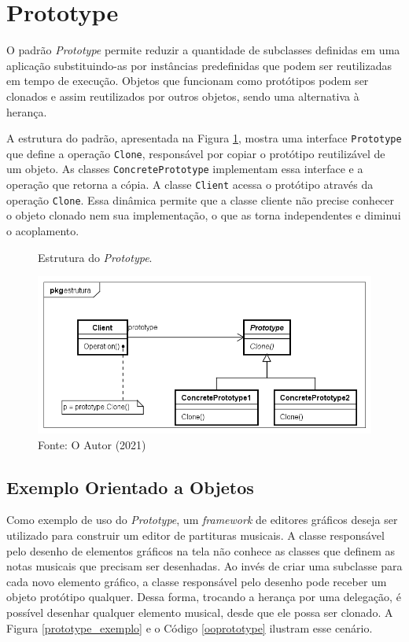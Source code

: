 \section{Prototype}

O padrão \textit{Prototype} permite reduzir a quantidade 
de subclasses definidas em uma aplicação 
substituindo-as por instâncias predefinidas 
que podem ser reutilizadas em tempo de 
execução. Objetos que funcionam como 
protótipos podem ser clonados e assim 
reutilizados por outros objetos, sendo uma 
alternativa à herança. \cite{gamma:1995}

A estrutura do padrão, apresentada na Figura 
\ref{prototype_struct}, mostra uma interface 
\texttt{Prototype} que define a operação \texttt{Clone}, responsável 
por copiar o protótipo reutilizável de um objeto. 
As classes \texttt{ConcretePrototype} implementam essa 
interface e a operação que retorna a cópia. 
A classe \texttt{Client} acessa o protótipo através da operação 
\texttt{Clone}. Essa dinâmica permite que a classe cliente 
não precise conhecer o objeto clonado nem sua 
implementação, o que as torna independentes e 
diminui o acoplamento.

\begin{figure}[htb]
	\caption{\label{prototype_struct}Estrutura do \textit{Prototype}.}
	\begin{center}
	    \includegraphics[scale=0.5]{5_padroes-contexto-funcional/5.1_criacionais/5.1.4_prototype/prototype_estrutura.png}
	\end{center}
  \caption*{Fonte: O Autor (2021)}
\end{figure}


\subsection*{Exemplo Orientado a Objetos}

Como exemplo de uso do \textit{Prototype}, um 
\textit{framework} de editores gráficos deseja 
ser utilizado para construir um editor de 
partituras musicais. A classe responsável pelo 
desenho de elementos gráficos na tela não 
conhece as classes que definem as notas musicais que 
precisam ser desenhadas. Ao invés de criar uma 
subclasse para cada novo elemento gráfico, 
a classe responsável pelo desenho 
pode receber um objeto protótipo qualquer. 
Dessa forma, trocando a herança 
por uma delegação, é possível desenhar qualquer 
elemento musical, desde que ele possa ser 
clonado. A Figura \ref{prototype_exemplo} e 
o Código \ref{ooprototype} ilustram esse cenário.

